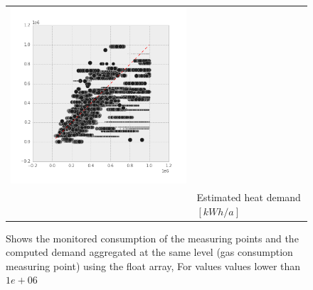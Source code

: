 \begin{figure}[htb]
\begin{tabular}{lccc}
 \includegraphics[width= 0.28\linewidth]{FIGURES/EcoFYS_06}\\
&\multicolumn{3}{l}{Estimated heat demand $[kWh/a]$}\\

\end{tabular}	
	\caption[consumption vs. demand with flooat array]
	{Shows the monitored consumption of the measuring points
	and the computed demand aggregated at the same level 
	(gas consumption measuring point) using the float array, 
	For values values lower than $1e+06$}
    \label{fig:con_dem_W06}
\end{figure}

